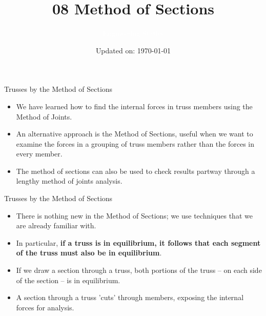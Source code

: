 \documentclass[9pt, xcolor={svgnames, x11names},professionalfonts]{beamer}
\title[08 Method of Sections]{\Huge 08 Method of Sections}
\subtitle[Engineering Statics]{\Large\textcolor{white}{Engineering Statics}}
\author{}
\date{\small Updated on: \today}
\begin{document}

\begin{frame}[plain]    %
	\titlepage
\end{frame}

%
\begin{frame}{Trusses by the Method of Sections}
	\begin{itemize}
		\item We have learned how to find the internal forces in truss members using the Method of Joints.\parb
		\item An alternative approach is the Method of Sections, useful when we want to examine the forces in a grouping of truss members rather than the forces in every member.\parb
		\item The method of sections can also be used to check results partway through a lengthy method of joints analysis.
	\end{itemize}

\end{frame}

\begin{frame}{Trusses by the Method of Sections}
	\begin{itemize}
		\item There is nothing new in the Method of Sections; we use techniques that we are already familiar with.\parb
		\item In particular, {\bf if a truss is in equilibrium, it follows that each segment of the truss must also be in equilibrium}.\parb
		\item If we draw a section through a truss, both portions of the truss -- on each side of the section -- is in equilibrium. \parb
		\item A section through a truss 'cuts' through members, exposing the internal forces for analysis.
	\end{itemize}

\end{frame}
\end{document}
